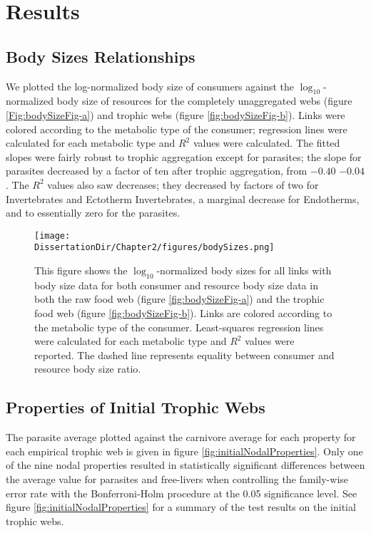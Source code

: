 \documentclass[../dissertation.tex]{subfiles}
\begin{document}
\section{Results} 

\subsection{Body Sizes Relationships} We plotted the log-normalized body size
of consumers against the $\log_{10}$-normalized body size of resources for the
completely unaggregated webs (figure \ref{Fig:bodySizeFig-a}) and trophic webs
(figure \ref{fig:bodySizeFig-b}). Links
were colored according to the metabolic type of the consumer; regression lines
were calculated for each metabolic type and $R^2$ values were calculated. The
fitted slopes were fairly robust to trophic aggregation except for parasites;
the slope for parasites decreased by a factor of ten after trophic aggregation,
from $-0.40$ $-0.04$. The $R^2$ values also saw decreases; they decreased by
factors of two for Invertebrates and Ectotherm Invertebrates, a marginal
decrease for Endotherms, and to essentially zero for the parasites.

\begin{figure}
    \centering
    {%
    }%

        \texttt{[image: \\DissertationDir/Chapter2/figures/bodySizes.png]}
        \caption{This figure shows the $\log_{10}$-normalized body sizes for
            all links with body size data for both consumer and resource body
            size data in both the raw food web (figure \ref{fig:bodySizeFig-a})
            and the trophic food web (figure \ref{fig:bodySizeFig-b}). Links
            are colored according to the metabolic type of the consumer.
            Least-squares regression lines were calculated for each metabolic
            type and $R^2$ values were reported. The dashed line represents
            equality between consumer and resource body size ratio.
        \label{fig:bodySizeFig}} 
\end{figure}

\subsection{Properties of Initial Trophic Webs} The parasite average plotted against the
carnivore average for each property for each empirical trophic web is given in
figure \ref{fig:initialNodalProperties}. Only one of the nine nodal properties
resulted in statistically significant differences between the average value for
parasites and free-livers when controlling the family-wise error rate with the
Bonferroni-Holm procedure at the 0.05 significance level.  See figure
\ref{fig:initialNodalProperties} for a summary of the test results on the
initial trophic webs.
\end{document}
